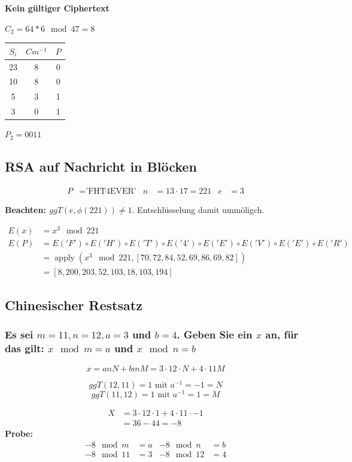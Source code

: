 \textbf{Kein gültiger Ciphertext}

$C_2= 64 * 6 \mod 47 = 8$

\begin{tabular}{ccc}
 $S_i$ & $Cm^{-1}$ & $P$ \\ \hline
 23    & 8  & 0  \\
 10    & 8  & 0  \\
 5     & 3  & 1  \\
 3     & 0   & 1  
\end{tabular}

$P_2 = 0011$

\subsection{RSA auf Nachricht in Blöcken}
\begin{align}
  P &= \text{'FHT4EVER'}  &
  n &= 13 \cdot 17 = 221 & e &= 3
\end{align}

\textbf{Beachten: $ggT(e, \phi(221) ) \ne 1$}. Entschlüsselung damit ummöligch.

\begin{align}
	E(x) &=  x^3 \mod 221 \\
	E(P) &=  E('F') \circ E('H')\circ E('T')\circ E('4')\circ E('E')\circ E('V')\circ E('E')\circ E('R')\\
		 &=  \operatorname{apply}(x^3 \mod 221 ,[70, 72, 84, 52, 69, 86, 69, 82])    \\
		 &=  [8, 200, 203, 52, 103, 18, 103, 194]
\end{align}


\subsection{Chinesischer Restsatz}
\subsubsection{Es sei $m = 11, n = 12, a = 3$ und $b = 4$. Geben Sie ein $x$ an, für das gilt: $x \mod m = a$ und $ x \mod n = b$}

\begin{equation}
	x = a n N + b m M  = 3 \cdot 12 \cdot N + 4 \cdot 11 M
\end{equation}

$$ggT(12, 11) = 1 \text{ mit } a^{-1} = -1 = N$$
$$ggT(11, 12) = 1 \text{ mit } a^{-1} =  1 = M$$

\begin{align}
	X &= 3 \cdot 12 \cdot 1 + 4 \cdot 11 \cdot -1 \\
	  &=  36 - 44 = -8
\end{align}
\textbf{Probe:}
\begin{align}
	-8 \mod  m &= a  & -8 \mod  n &= b \\
	-8 \mod 11 &= 3  & -8 \mod 12 &= 4 \\
\end{align}


